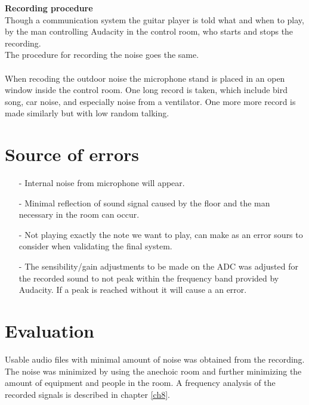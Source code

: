 \textbf{Recording procedure}\\
Though a communication system the guitar player is told what and when to play, by the man controlling Audacity in the control room, who starts and stops the recording. \\
The procedure for recording the noise goes the same.\\
\\
When recoding the outdoor noise the microphone stand is placed in an open window inside the control room. One long record is taken, which include bird song, car noise, and especially noise from a ventilator. One more more record is made similarly but with low random talking.       

\section{Source of errors}
\begin{itemize}
\item[-] Internal noise from microphone will appear. 
\item[-] Minimal reflection of sound signal caused by the floor and the man necessary in the room can occur. 
\item[-]	 Not playing exactly the note we want to play, can make as an error sours to consider when validating the final system.\item[-] The sensibility/gain adjustments to be made on the ADC was adjusted for the recorded sound to not peak within the frequency band provided by Audacity. If a peak is reached without it will cause a an error.            
\end{itemize}

\section{Evaluation}
Usable audio files with minimal amount of noise was obtained from the recording. The noise was minimized by using the anechoic room and further minimizing the amount of equipment and  people in the room.       
A frequency analysis of the recorded signals is described in chapter \ref{ch8}.  

